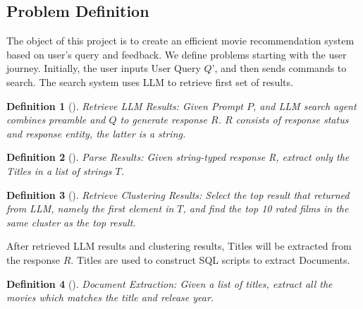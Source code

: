 \documentclass[journal]{IEEEtran}
\theoremstyle{mydefstyle}
\newtheorem{definition}{Definition}[section]
\begin{document}
\subsection{Problem Definition}
The object of this project is to create an efficient movie recommendation system based on user’s query and feedback. We define problems starting with the user journey. Initially, the user inputs User Query \(Q’\), and then sends commands to search. The search system uses LLM to retrieve first set of results.

\begin{adjustwidth}{0.75cm}{} \begin{definition}[]
\textit{Retrieve LLM Results:} Given Prompt \( P \), and LLM search agent combines preamble and \( Q \) to generate response \( R \). \( R \) consists of response status and response entity, the latter is a string.
\end{definition} \end{adjustwidth}
\vspace{10pt} 

\begin{adjustwidth}{0.75cm}{} \begin{definition}[]
\textit{Parse Results:} Given string-typed response R, extract only the Titles in a list of strings \( T \). 
\end{definition} \end{adjustwidth}
\vspace{10pt} 

\begin{adjustwidth}{0.75cm}{} \begin{definition}[]
\textit{Retrieve Clustering Results:} Select the top result that returned from LLM, namely the first element in \( T \), and find the top 10 rated films in the same cluster as the top result.
\end{definition} \end{adjustwidth}
\vspace{10pt} 

After retrieved LLM results and clustering results, Titles will be extracted from the response \( R \). Titles are used to construct SQL scripts to extract Documents.

\begin{adjustwidth}{0.75cm}{} \begin{definition}[]
\textit{Document Extraction:} Given a list of titles, extract all the movies which matches the title and release year.
\end{definition} \end{adjustwidth}
\vspace{10pt} 
\end{document}
